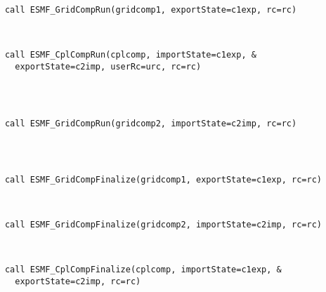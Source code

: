  \begin{verbatim}


      call ESMF_GridCompRun(gridcomp1, exportState=c1exp, rc=rc)
 
\end{verbatim}
 

 \begin{verbatim}

      call ESMF_CplCompRun(cplcomp, importState=c1exp, &
        exportState=c2imp, userRc=urc, rc=rc)
 
\end{verbatim}
 

 \begin{verbatim}


      call ESMF_GridCompRun(gridcomp2, importState=c2imp, rc=rc)
 
\end{verbatim}
 

 \begin{verbatim}


      call ESMF_GridCompFinalize(gridcomp1, exportState=c1exp, rc=rc)
 
\end{verbatim}
 

 \begin{verbatim}

      call ESMF_GridCompFinalize(gridcomp2, importState=c2imp, rc=rc)
 
\end{verbatim}
 

 \begin{verbatim}

      call ESMF_CplCompFinalize(cplcomp, importState=c1exp, &
        exportState=c2imp, rc=rc)

 
\end{verbatim}

\setlength{\parskip}{\oldparskip}
\setlength{\parindent}{\oldparindent}
\setlength{\baselineskip}{\oldbaselineskip}
